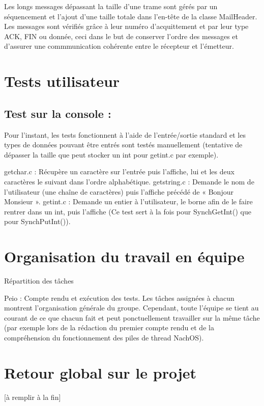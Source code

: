 \documentclass[12pt]{report}
\begin{document}
\bigskip


Les longs messages dépassant la taille d’une trame sont gérés par
un séquencement et l’ajout d'une taille totale dans l’en-tête de la classe MailHeader. \\


Les messages sont vérifiés grâce à leur numéro d'acquittement et par leur type ACK, FIN ou donnée, ceci dans le but de conserver l'ordre des messages et d'assurer une commmunication cohérente entre le récepteur et l'émetteur.


\chapter{Tests utilisateur}
\section{Test sur la console :}
Pour l’instant, les tests fonctionnent à l’aide de l’entrée/sortie standard et les types de données pouvant être entrés sont testés manuellement (tentative de dépasser la taille que peut stocker un int pour getint.c par exemple).

getchar.c : Récupère un caractère sur l’entrée puis l’affiche, lui et les deux caractères le suivant dans l’ordre alphabétique.
getstring.c : Demande le nom de l’utilisateur (une chaîne de caractères) puis l’affiche précédé de « Bonjour Monsieur ».
 getint.c : Demande un entier à l’utilisateur, le borne afin de le faire rentrer dans un int, puis l’affiche (Ce test sert à la fois pour SynchGetInt() que pour SynchPutInt()).


\chapter{Organisation du travail en équipe}
Répartition des tâches

Peio : Compte rendu et exécution des tests.
Les tâches assignées à chacun montrent l’organisation générale du groupe. Cependant, toute l’équipe se tient au courant de ce que chacun fait et peut ponctuellement travailler sur la même tâche (par exemple lors de la rédaction du premier compte rendu et de la compréhension du fonctionnement des piles de thread NachOS).


\chapter{Retour global sur le projet}

[à remplir à la fin]
\end{document}
